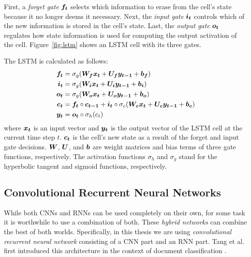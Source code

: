 First, a \emph{forget gate} $\boldsymbol{f_t}$ selects which information to erase from the cell's state because it no longer deems it necessary. Next, the \emph{input gate} $\boldsymbol{i_t}$ controls which of the new information is stored in the cell's state. Last, the \emph{output gate} $\boldsymbol{o_t}$ regulates how state information is used for computing the output activation of the cell. Figure~\ref{fig:lstm} shows an LSTM cell with its three gates.

The LSTM is calculated as follows:
$$
  \begin{aligned}
\boldsymbol{f_t} &= \sigma_g(\boldsymbol{W_{f}} \boldsymbol{x_t} + \boldsymbol{U_{f}} \boldsymbol{y_{t-1}} + \boldsymbol{b_f}) \\
\boldsymbol{i_t} &= \sigma_g(\boldsymbol{W_{i}} \boldsymbol{x_t} + \boldsymbol{U_{i}} \boldsymbol{y_{t-1}} + \boldsymbol{b_i}) \\
\boldsymbol{o_t} &= \sigma_g(\boldsymbol{W_{o}} \boldsymbol{x_t} + \boldsymbol{U_{o}} \boldsymbol{y_{t-1}} + \boldsymbol{b_o}) \\
\boldsymbol{c_t} &= \boldsymbol{f_t} \circ \boldsymbol{c_{t-1}} + \boldsymbol{i_t} \circ \sigma_c(\boldsymbol{W_{c}} \boldsymbol{x_t} + \boldsymbol{U_{c}} \boldsymbol{y_{t-1}} + \boldsymbol{b_c}) \\
\boldsymbol{y_t} &= \boldsymbol{o_t} \circ \sigma_h(c_t)
  \end{aligned}
$$
where $\boldsymbol{x_t}$ is an input vector and $\boldsymbol{y_t}$ is the output vector of the LSTM cell at the current time step $t$. $\boldsymbol{c_t}$ is the cell's new state as a result of the forget and input gate decisions. $\boldsymbol{W}$, $\boldsymbol{U}$, and $\boldsymbol{b}$ are weight matrices and bias terms of three gate functions, respectively. The activation functions $\sigma_h$ and $\sigma_g$ stand for the hyperbolic tangent and sigmoid functions, respectively.


\subsection{Convolutional Recurrent Neural Networks}
\label{sec:hybrid_networks}
While both CNNs and RNNs can be used completely on their own, for some task it is worthwhile to use a combination of both. These \emph{hybrid networks} can combine the best of both worlds. Specifically, in this thesis we are using \emph{convolutional recurrent neural network} consisting of a CNN part and an RNN part. Tang et al. first introduced this architecture in the context of document classification \cite{tang2015document}.

